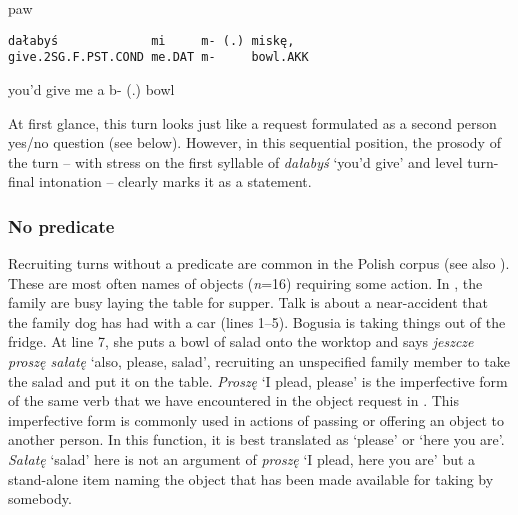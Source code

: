 \documentclass[output=paper]{langsci/langscibook}
\begin{document}
\vspace{2mm}
%
%
\begin{mdframednoverticalspace}[style=firstfoc]
\begin{transbox}{2}{paw}
\begin{verbatim}
dałabyś             mi     m- (.) miskę,
give.2SG.F.PST.COND me.DAT m-     bowl.AKK
\end{verbatim}
you’d give me a b- (.) bowl
\end{transbox}
\end{mdframednoverticalspace}
%
\begin{mdframednoverticalspace}[style=secondfoc]
\end{mdframednoverticalspace}

At first glance, this turn looks just like a request formulated as a second person yes/no question (see  below).  However, in this sequential position, the prosody of the turn -- with stress on the first syllable of \textit{dałabyś} ‘you’d give’ and level turn-final intonation -- clearly marks it as a statement.

\subsubsection{No predicate}\label{sec:zinken:3.3.3}

Recruiting turns without a predicate are common in the Polish corpus (see also ).  These are most often names of objects (\textit{n}=16) requiring some action.  In , the family are busy laying the table for supper.  Talk is about a near-accident that the family dog has had with a car (lines 1--5).  Bogusia is taking things out of the fridge.  At line 7, she puts a bowl of salad onto the worktop and says \textit{jeszcze proszę sałatę} ‘also, please, salad’, recruiting an unspecified family member to take the salad and put it on the table.  \textit{Proszę} ‘I plead, please’ is the imperfective form of the same verb that we have encountered in the object request in .   This imperfective form is commonly used in actions of passing or offering an object to another person.  In this function, it is best translated as ‘please’ or ‘here you are’. \textit{Sałatę} ‘salad’ here is not an argument of \textit{proszę} ‘I plead, here you are’ but a stand-alone item naming the object that has been made available for taking by somebody.
\end{document}
